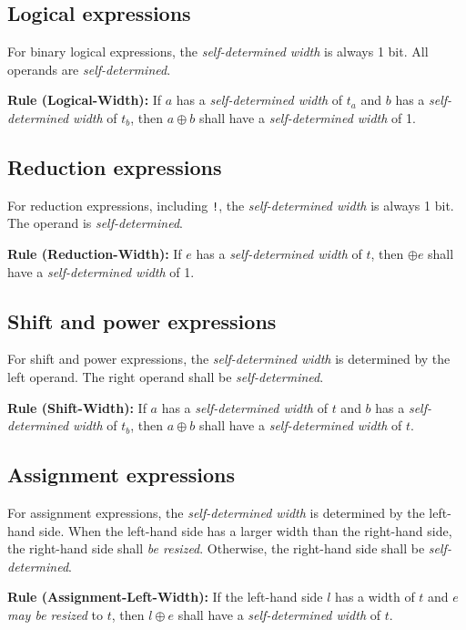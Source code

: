 \documentclass{article}
\newcommand{\sds}{\emph{self-determined width}}
\newcommand{\mbr}{\emph{may be resized}}
\newenvironment{typingrule}[1]%
{\par\noindent\textbf{Rule (#1):} }%
{\par}
\begin{document}
\subsection{Logical expressions}%

For binary logical expressions, the \sds{} is always 1 bit.
All operands are \emph{self-determined}.

\begin{typingrule}{Logical-Width}
  If $a$ has a \sds{} of $t_{a}$ and $b$ has a
  \sds{} of $t_{b}$, then $a \oplus b$ shall have a
  \sds{} of 1.
\end{typingrule}

\subsection{Reduction expressions}%

For reduction expressions, including \texttt{!}, the \sds{}
is always 1 bit. The operand is \emph{self-determined}.

\begin{typingrule}{Reduction-Width}
  If $e$ has a \sds{} of $t$, then $\oplus e$ shall have a
  \sds{} of 1.
\end{typingrule}

\subsection{Shift and power expressions}%

For shift and power expressions, the \sds{} is determined
by the left operand. The right operand shall be \emph{self-determined}.

\begin{typingrule}{Shift-Width}
  If $a$ has a \sds{} of $t$ and $b$ has a
  \sds{} of $t_{b}$, then $a \oplus b$ shall have a
  \sds{} of $t$.
\end{typingrule}

\subsection{Assignment expressions}%

For assignment expressions, the \sds{} is determined by the
left-hand side. When the left-hand side has a larger width than the right-hand
side, the right-hand side shall \emph{be resized}. Otherwise, the right-hand
side shall be \emph{self-determined}.

\begin{typingrule}{Assignment-Left-Width}
  If the left-hand side $l$ has a width of $t$ and $e$ \mbr{} to
  $t$, then $l \oplus e$ shall have a \sds{} of $t$.
\end{typingrule}
\end{document}
